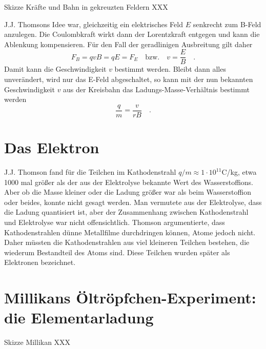 \begin{marginfigure}
    \caption{Skizze Kräfte und Bahn in gekreuzten Feldern XXX}
\end{marginfigure}


J.J. Thomsons Idee war, gleichzeitig ein elektrisches Feld $E$ senkrecht zum B-Feld anzulegen. Die Coulombkraft wirkt dann der Lorentzkraft entgegen und kann die Ablenkung kompensieren. Für den Fall der geradlinigen Ausbreitung gilt daher
\begin{equation}
    F_B = q v B = q E = F_E  \quad \text{bzw.} \quad v = \frac{E}{B}  \quad .
\end{equation}
Damit kann die Geschwindigkeit $v$ bestimmt werden. Bleibt dann alles unverändert, wird nur das E-Feld abgeschaltet, so kann mit der nun bekannten Geschwindigkeit $v$ aus der Kreisbahn das Ladungs-Masse-Verhältnis bestimmt werden
\begin{equation}
    \frac{q}{m} = \frac{v}{r B}  \quad .
\end{equation}



\section{Das Elektron}

J.J. Thomson fand für die Teilchen im Kathodenstrahl $q/m \approx 1 \cdot 10^{11}$C/kg, etwa 1000 mal größer als der aus der Elektrolyse bekannte Wert des Wasserstoffions. Aber ob die Masse kleiner oder die Ladung größer war als beim Wasserstoffion oder beides, konnte nicht gesagt werden. Man vermutete aus der Elektrolyse, dass die Ladung quantisiert ist, aber der Zusammenhang zwischen Kathodenstrahl und Elektrolyse war nicht offensichtlich. Thomson argumentierte, dass Kathodenstrahlen dünne Metallfilme durchdringen können, Atome jedoch nicht. Daher müssten die Kathodenstrahlen aus viel kleineren Teilchen bestehen, die wiederum Bestandteil des Atoms sind. Diese Teilchen wurden später als Elektronen bezeichnet.

\section{Millikans Öltröpfchen-Experiment: die Elementarladung}

\begin{marginfigure}
    \caption{Skizze Millikan  XXX}
\end{marginfigure}



